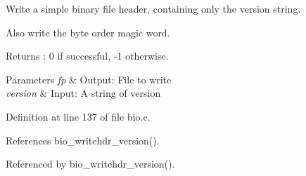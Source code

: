 \-Write a simple binary file header, containing only the version string. 

\-Also write the byte order magic word. \begin{DoxyReturn}{\-Returns}
\-: 0 if successful, -\/1 otherwise. 
\end{DoxyReturn}

\begin{DoxyParams}{\-Parameters}
{\em fp} & \-Output\-: \-File to write \\
\hline
{\em version} & \-Input\-: \-A string of version \\
\hline
\end{DoxyParams}


\-Definition at line 137 of file bio.\-c.



\-References bio\-\_\-writehdr\-\_\-version().



\-Referenced by bio\-\_\-writehdr\-\_\-version().

